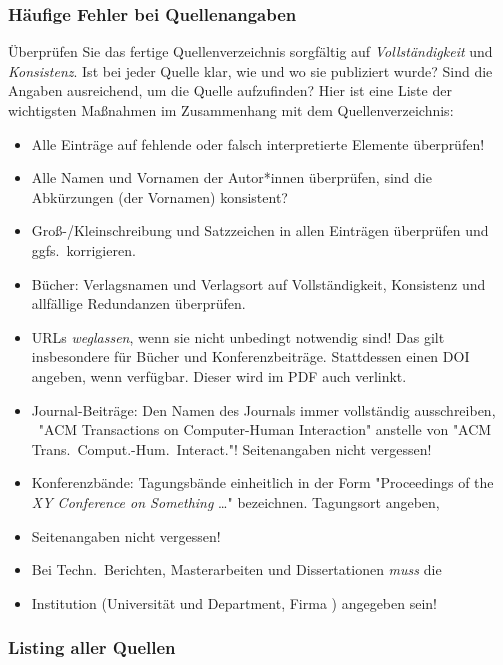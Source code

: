 \subsubsection{Häufige Fehler bei Quellenangaben}

Überprüfen Sie das fertige Quellenverzeichnis sorgfältig auf
\emph{Vollständigkeit} und \emph{Konsistenz}. Ist bei jeder Quelle klar, wie
und wo sie publiziert wurde? Sind die Angaben ausreichend, um die Quelle
aufzufinden? Hier ist eine Liste der wichtigsten Maßnahmen im Zusammenhang
mit dem Quellenverzeichnis:
%
\begin{itemize}
    \item
    Alle Einträge auf fehlende oder falsch interpretierte Elemente überprüfen!
    \item
    Alle Namen und Vornamen der Autor*innen überprüfen, sind die Abkürzungen
    (der Vornamen) konsistent?
    \item
    Groß-/Kleinschreibung und Satzzeichen in allen Einträgen überprüfen und
    ggfs.\ korrigieren.
    \item
    Bücher: Verlagsnamen und Verlagsort auf Vollständigkeit, Konsistenz und
    allfällige Redundanzen überprüfen.
    \item
    URLs \emph{weglassen}, wenn sie nicht unbedingt notwendig sind! Das gilt
    insbesondere für Bücher und Konferenzbeiträge. Stattdessen einen DOI
    angeben, wenn verfügbar. Dieser wird im PDF auch verlinkt.
    \item
    Journal-Beiträge: Den Namen des Journals immer vollständig ausschreiben,
    \zB\ "ACM Transactions on Computer-Human Interaction" anstelle von "ACM
    Trans.\ Comput.-Hum.\ Interact."! Seitenangaben nicht vergessen!
    \item
    Konferenzbände: Tagungsbände einheitlich in der Form "Proceedings of the
    \emph{XY Conference on Something} \ldots" bezeichnen. Tagungsort angeben,
    \item Seitenangaben nicht vergessen!
    \item
    Bei Techn.\ Berichten, Masterarbeiten und Dissertationen \emph{muss} die
    \item Institution (Universität und Department, Firma \etc) angegeben sein!
\end{itemize}

\subsubsection{Listing aller Quellen}


